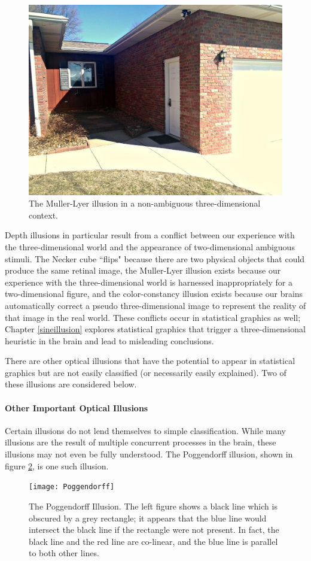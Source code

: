 \documentclass[11pt]{isuthesis}\usepackage[]{graphicx}\usepackage[]{color}
\begin{document}
\begin{figure}[htbp]\centering
\includegraphics[width=.5\linewidth]{mullerlyerhouse}
\caption[Muller Lyer Real World Context]{The Muller-Lyer illusion in a non-ambiguous three-dimensional context.}\label{fig:mullerlyerhouse}
\end{figure}

Depth illusions in particular result from a conflict between our experience with the three-dimensional world and the appearance of two-dimensional ambiguous stimuli. The Necker cube ``flips" because there are two physical objects that could produce the same retinal image, the Muller-Lyer illusion exists because our experience with the three-dimensional world is harnessed inappropriately for a two-dimensional figure, and the color-constancy illusion exists because our brains automatically correct a pseudo three-dimensional image to represent the reality of that image in the real world. These conflicts occur in statistical graphics as well; Chapter \ref{sineillusion} explores statistical graphics that trigger a three-dimensional heuristic in the brain and lead to misleading conclusions.

There are other optical illusions that have the potential to appear in statistical graphics but are not easily classified (or necessarily easily explained). Two of these illusions are considered below.
\paragraph{Other Important Optical Illusions}
Certain illusions do not lend themselves to simple classification. While many illusions are the result of multiple concurrent processes in the brain, these illusions may not even be fully understood. The Poggendorff illusion, shown in figure \ref{fig:poggendorff}, is one such illusion. 

\begin{figure}[htbp]\centering
\texttt{[image: Poggendorff]}
\caption[The Poggendorff Illusion]{The Poggendorff Illusion. The left figure shows a black line which is obscured by a grey rectangle; it appears that the blue line would intersect the black line if the rectangle were not present. In fact, the black line and the red line are co-linear, and the blue line is parallel to both other lines.}\label{fig:poggendorff}
\end{figure}
\end{document}
